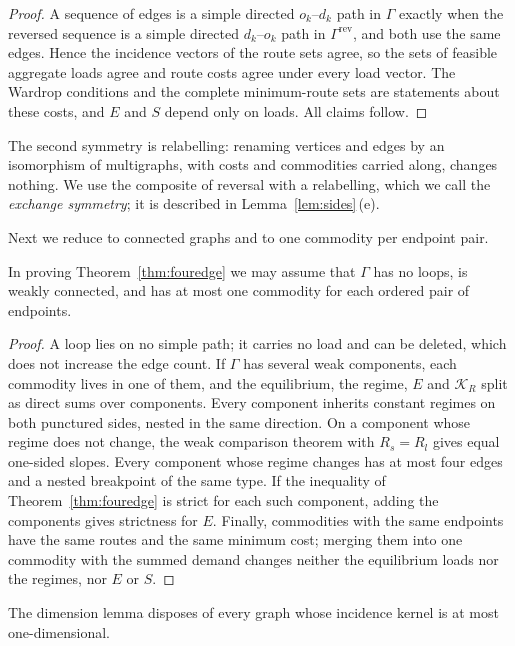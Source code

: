 \begin{proof}
A sequence of edges is a simple directed $o_k$--$d_k$ path in $\Gamma$
exactly when the reversed sequence is a simple directed $d_k$--$o_k$ path in
$\Gamma^{\mathrm{rev}}$, and both use the same edges. Hence the incidence
vectors of the route sets agree, so the sets of feasible aggregate loads
agree and route costs agree under every load vector. The Wardrop conditions
and the complete minimum-route sets are statements about these costs, and
$E$ and $S$ depend only on loads. All claims follow.
\end{proof}

The second symmetry is relabelling: renaming vertices and edges by an
isomorphism of multigraphs, with costs and commodities carried along, changes
nothing. We use the composite of reversal with a relabelling, which we call
the \emph{exchange symmetry}; it is described in
Lemma~\ref{lem:sides}\,(e).

Next we reduce to connected graphs and to one commodity per endpoint pair.

\begin{lemma}[Reductions]\label{lem:reductions}
In proving Theorem~\ref{thm:fouredge} we may assume that $\Gamma$ has no
loops, is weakly connected, and has at most one commodity for each ordered
pair of endpoints.
\end{lemma}

\begin{proof}
A loop lies on no simple path; it carries no load and can be deleted, which
does not increase the edge count. If $\Gamma$ has several weak components,
each commodity lives in one of them, and the equilibrium, the regime, $E$ and
$\mathcal K_R$ split as direct sums over components. Every component inherits
constant regimes on both punctured sides, nested in the same direction. On a
component whose regime does not change, the weak comparison theorem with
$R_s=R_l$ gives equal one-sided slopes. Every component whose regime changes
has at most four edges and a nested breakpoint of the same type. If the
inequality of Theorem~\ref{thm:fouredge} is strict for each such component,
adding the components gives strictness for $E$. Finally, commodities with
the same endpoints have the same routes and the same minimum cost; merging
them into one commodity with the summed demand changes neither the
equilibrium loads nor the regimes, nor $E$ or $S$.
\end{proof}

The dimension lemma disposes of every graph whose incidence kernel is at most
one-dimensional.


